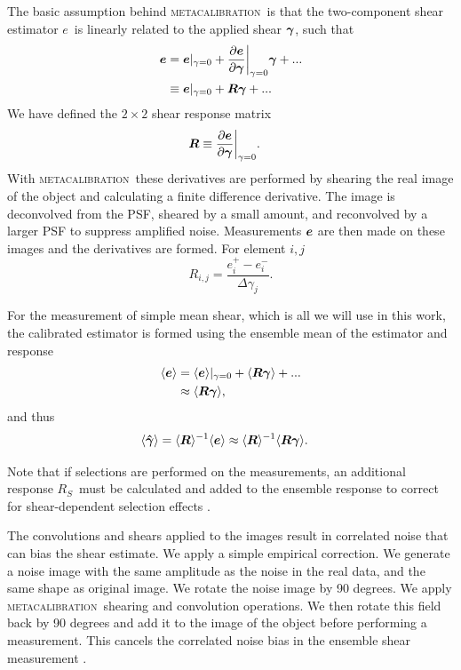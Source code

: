 \documentclass[fleqn,useAMS,usenatbib]{mnras}
\newcommand{\mcal}{\textsc{metacalibration}}
\newcommand{\vest}{\mbox{\boldmath $e$}}
\newcommand{\est}{e}
\newcommand{\mcalR}{\mbox{\boldmath $R$}}
\newcommand{\mcalRS}{\mbox{\boldmath $R_S$}}
\newcommand{\gest}{\mbox{\boldmath $\hat \gamma$}}
\newcommand{\vecgam}{\mbox{\boldmath $\gamma$}}
\begin{document}
The basic assumption behind \mcal\ is that the two-component shear estimator \vest\
is linearly related to the applied shear $\vecgam$, such that
\begin{align} \label{eq:Eexpand}
    \vest &= \vest|_{\gamma=0} + \frac{ \partial \vest }{ \partial \vecgam}\bigg|_{\gamma=0} \vecgam  + ... \nonumber \\
          &\equiv \vest|_{\gamma=0} + \mbox{\mcalR}\vecgam  + ...
\end{align}
We have defined the $2 \times 2$ shear response matrix
\begin{align}
    \mbox{\mcalR} &\equiv \frac{\partial \vest}{\partial \vecgam} \bigg|_{\gamma=0}.
\end{align}
With \mcal\ these derivatives are performed by shearing the real image
of the object and calculating a finite difference derivative.  The image
is deconvolved from the PSF, sheared by a small amount, and reconvolved by
a larger PSF to suppress amplified noise.  Measurements $\vest$ are then made
on these images and the derivatives are formed. For element $i,j$
\begin{equation} \label{eq:Rnum}
    R_{i,j} = \frac{\est_i^+ - \est_i^-}{\Delta \gamma_j}.
\end{equation}

For the measurement of simple mean shear, which is all we will  use in this
work, the calibrated estimator is formed using the ensemble mean of the
estimator and response
\begin{align}
    \langle \vest \rangle &= \langle \vest \rangle |_{\gamma=0} + \langle \mbox{\mcalR} \vecgam \rangle + ... \nonumber \\
                          &\approx \langle \mbox{\mcalR} \vecgam \rangle,
\end{align}
and thus
\begin{align} \label{eq:rcorr}
    \langle \gest \rangle &= \langle \mbox{\mcalR} \rangle^{-1}  \langle \vest \rangle \approx \langle \mbox{\mcalR} \rangle^{-1} \langle \mcalR \vecgam \rangle.
\end{align}

Note that if selections are performed on the measurements, an additional
response \mcalRS\ must be calculated and added to the ensemble response
to correct for shear-dependent selection effects \citep{SheldonHuff2017}.

The convolutions and shears applied to the images result in correlated noise
that can bias the shear estimate. We apply a simple empirical correction. We
generate a noise image with the same amplitude as the noise in the real data,
and the same shape as original image.  We rotate the noise image by 90 degrees.
We apply \mcal\ shearing and convolution operations.  We then rotate this field
back by 90 degrees and add it to the image of the object before performing a
measurement. This cancels the correlated noise bias in the ensemble shear
measurement \citep{SheldonHuff2017}.
\end{document}
